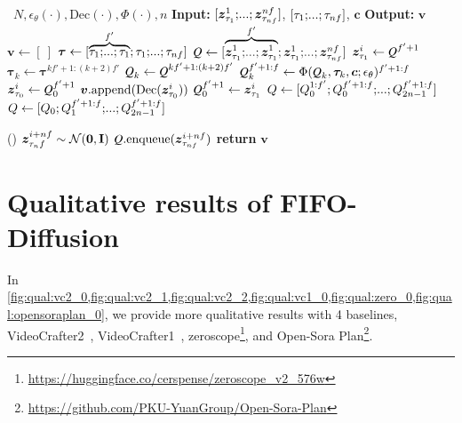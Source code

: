 \begin{algorithm}[h!]
    \caption{FIFO-Diffusion with lookahead denoising~(\cref{subsec:look_ahead_denoising})}
    \label{alg:fifo_algorithm_full}
    \begin{algorithmic} 
        \Require~$N, \epsilon_\theta(\cdot), \text{Dec}(\cdot), \Phi(\cdot), n$ 
        \State \textbf{Input:} $[\gz_{\tau_1}^1;\text{\myldots};\gz_{\tau_{nf}}^{nf}]$, $[\tau_1;\text{\myldots};\tau_{nf}]$, $\bm{c}$
        \State \textbf{Output:} $\bm{v}$
        \State $\bm{v} \leftarrow [~]$
        \State $\bm{\tau} \leftarrow [\overbrace{\tau_1;\text{\myldots};\tau_1}^{f'};\tau_{1};\text{\myldots};\tau_{nf}]$
        \State $\Q \leftarrow [\overbrace{\gz_{\tau_{1}}^{1};\text{\myldots};\gz_{\tau_{1}}^{1}}^{f'};\gz_{\tau_{1}}^{1};\text{\myldots};\gz_{\tau_{nf}}^{nf}]$ 
        \vspace{2mm}
            \State $\gz_{\tau_{1}}^{i} \leftarrow \Q^{f'+1}$
             
                \State $\bm{\tau}_k \leftarrow \bm{\tau}^{kf'+1:(k+2)f'}$
                \State $\Q_k \leftarrow \Q^{kf'+1:(k+2)f'}$
                \vspace{1mm}
                \State $\Q_k^{f'+1:f} \leftarrow \Phi(\Q_k,\bm{\tau}_k,\bm{c};\epsilon_\theta)^{f'+1:f}$ 
            \EndFor
            \State $\gz_{\tau_{0}}^{i} \leftarrow \Q_0^{f'+1}$
            \State $\bm{v}\text{.append}(\text{Dec}(\bm{z}_{\tau_0}^i))$ 
            \State $\Q_0^{f'+1} \leftarrow \gz_{\tau_{1}}^{i}$
            \State $Q \leftarrow [Q_0^{1:f'};Q_0^{f'+1:f};\text{\myldots};Q_{2n-1}^{f'+1:f}]$
            \vspace{1mm}
            \State $Q \leftarrow [Q_0;Q_1^{f'+1:f};\text{\myldots};Q_{2n-1}^{f'+1:f}]$
            
            
            \State \Q{}()
            \vspace{1mm}
            \State $\bm{z}_{\tau_nf}^{i+nf}\sim \mathcal{N}(\mathbf{0},\mathbf{I})$
            \State $\Q\text{.enqueue}(\gz_{\tau_{nf}}^{i+nf})$
        \EndFor
        \State \textbf{return} $\bm{v}$
    \end{algorithmic}
\end{algorithm}

\clearpage
\section{Qualitative results of FIFO-Diffusion}
\label{app:qual}
In \cref{fig:qual:vc2_0,fig:qual:vc2_1,fig:qual:vc2_2,fig:qual:vc1_0,fig:qual:zero_0,fig:qual:opensoraplan_0}, we provide more qualitative results with 4 baselines, VideoCrafter2~\citep{chen2024videocrafter2}, VideoCrafter1~\citep{chen2023videocrafter1}, zeroscope\footnote{\url{https://huggingface.co/cerspense/zeroscope\_v2\_576w}}, and Open-Sora Plan\footnote{\url{https://github.com/PKU-YuanGroup/Open-Sora-Plan}}.

